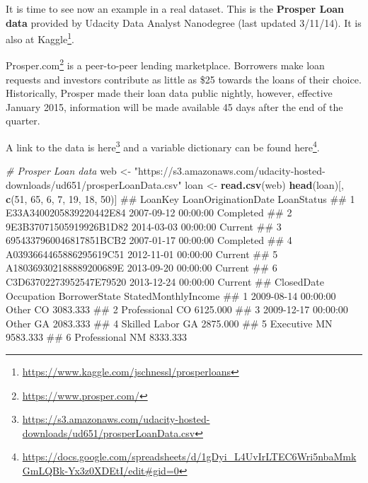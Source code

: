 \documentclass[]{book}
\makeatletter
\newenvironment{Shaded}{\begin{snugshade}}{\end{snugshade}}
\newcommand{\KeywordTok}[1]{\textcolor[rgb]{0.13,0.29,0.53}{\textbf{#1}}}
\newcommand{\DecValTok}[1]{\textcolor[rgb]{0.00,0.00,0.81}{#1}}
\newcommand{\StringTok}[1]{\textcolor[rgb]{0.31,0.60,0.02}{#1}}
\newcommand{\CommentTok}[1]{\textcolor[rgb]{0.56,0.35,0.01}{\textit{#1}}}
\newcommand{\NormalTok}[1]{#1}
\let\rmarkdownfootnote\footnote%
\def\footnote{\protect\rmarkdownfootnote}
\renewcommand{\href}[2]{#2\footnote{\url{#1}}}
\newenvironment{kframe}{%
\medskip{}
\setlength{\fboxsep}{.8em}
 \def\at@end@of@kframe{}%
 \ifinner\ifhmode%
  \def\at@end@of@kframe{\end{minipage}}%
  \begin{minipage}{\columnwidth}%
 \fi\fi%
 \def\FrameCommand##1{\hskip\@totalleftmargin \hskip-\fboxsep
 \colorbox{shadecolor}{##1}\hskip-\fboxsep
     \hskip-\linewidth \hskip-\@totalleftmargin \hskip\columnwidth}%
 \MakeFramed {\advance\hsize-\width
   \@totalleftmargin\z@ \linewidth\hsize
   \@setminipage}}%
 {\par\unskip\endMakeFramed%
 \at@end@of@kframe}
\renewenvironment{Shaded}{\begin{kframe}}{\end{kframe}}
\theoremstyle{definition}
\theoremstyle{definition}
\theoremstyle{definition}
\theoremstyle{remark}
\makeatother
\begin{document}
 It is time to see now an example in a real dataset. This is the
\textbf{Prosper Loan data} provided by Udacity Data Analyst Nanodegree
(last updated 3/11/14). It is also at
\href{https://www.kaggle.com/jschnessl/prosperloans}{Kaggle}.

\href{https://www.prosper.com/}{Prosper.com} is a peer-to-peer lending
marketplace. Borrowers make loan requests and investors contribute as
little as \$25 towards the loans of their choice. Historically, Prosper
made their loan data public nightly, however, effective January 2015,
information will be made available 45 days after the end of the quarter.

A link to the data is
\href{https://s3.amazonaws.com/udacity-hosted-downloads/ud651/prosperLoanData.csv}{here}
and a variable dictionary can be found
\href{https://docs.google.com/spreadsheets/d/1gDyi_L4UvIrLTEC6Wri5nbaMmkGmLQBk-Yx3z0XDEtI/edit\#gid=0}{here}.

\begin{Shaded}
\begin{Highlighting}[]
\CommentTok{# Prosper Loan data}
\NormalTok{web <-}\StringTok{ "https://s3.amazonaws.com/udacity-hosted-downloads/ud651/prosperLoanData.csv"}
\NormalTok{loan <-}\StringTok{ }\KeywordTok{read.csv}\NormalTok{(web)}
\KeywordTok{head}\NormalTok{(loan)[, }\KeywordTok{c}\NormalTok{(}\DecValTok{51}\NormalTok{, }\DecValTok{65}\NormalTok{, }\DecValTok{6}\NormalTok{, }\DecValTok{7}\NormalTok{, }\DecValTok{19}\NormalTok{, }\DecValTok{18}\NormalTok{, }\DecValTok{50}\NormalTok{)]}
\NormalTok{##                   LoanKey LoanOriginationDate LoanStatus}
\NormalTok{## 1 E33A3400205839220442E84 2007-09-12 00:00:00  Completed}
\NormalTok{## 2 9E3B37071505919926B1D82 2014-03-03 00:00:00    Current}
\NormalTok{## 3 6954337960046817851BCB2 2007-01-17 00:00:00  Completed}
\NormalTok{## 4 A0393664465886295619C51 2012-11-01 00:00:00    Current}
\NormalTok{## 5 A180369302188889200689E 2013-09-20 00:00:00    Current}
\NormalTok{## 6 C3D63702273952547E79520 2013-12-24 00:00:00    Current}
\NormalTok{##            ClosedDate    Occupation BorrowerState StatedMonthlyIncome}
\NormalTok{## 1 2009-08-14 00:00:00         Other            CO            3083.333}
\NormalTok{## 2                      Professional            CO            6125.000}
\NormalTok{## 3 2009-12-17 00:00:00         Other            GA            2083.333}
\NormalTok{## 4                     Skilled Labor            GA            2875.000}
\NormalTok{## 5                         Executive            MN            9583.333}
\NormalTok{## 6                      Professional            NM            8333.333}
\end{Highlighting}
\end{Shaded}
\end{document}
